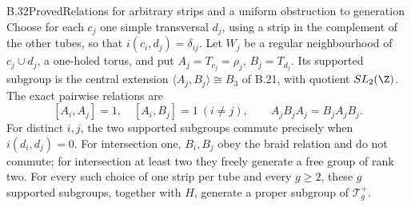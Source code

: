 \begin{claim}{B.32}{Proved}{Relations for arbitrary strips and a uniform obstruction to generation}
Choose for each $c_j$ one simple transversal $d_j$, using a strip in
the complement of the other tubes, so that
$i(c_i,d_j)=\delta_{ij}$. Let $W_j$ be a regular neighbourhood of
$c_j\cup d_j$, a one-holed torus, and put
$A_j=T_{c_j}=\rho_j$, $B_j=T_{d_j}$. Its supported subgroup is the
central extension $\langle A_j,B_j\rangle\cong B_3$ of B.21, with
quotient $SL_2(\Z)$. The exact pairwise relations are
\[
 [A_i,A_j]=1,\quad [A_i,B_j]=1\ (i\ne j),\qquad
 A_jB_jA_j=B_jA_jB_j.
\]
For distinct $i,j$, the two supported subgroups commute precisely when
$i(d_i,d_j)=0$. For intersection one, $B_i,B_j$ obey the braid
relation and do not commute; for intersection at least two they freely
generate a free group of rank two. For every such choice of one strip
per tube and every $g\ge2$, these $g$ supported subgroups, together
with $H$, generate a proper subgroup of $\mathcal T_g^+$.
\end{claim}
